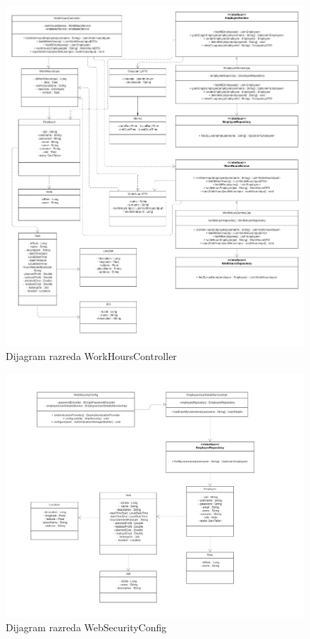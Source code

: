 			\begin{figure}[H]
					\centering
					\includegraphics[width=\textwidth]{slike/Dijagram razreda - WorkHoursController.jpg}
					\caption{Dijagram razreda WorkHoursController}
				\end{figure}
			
			
			\eject
			\begin{figure}[H]
					\centering
					\includegraphics[width=\textwidth]{slike/Dijagram razreda - WebSecurityConfig.jpeg}
					\caption{Dijagram razreda WebSecurityConfig}
				\end{figure}
			

